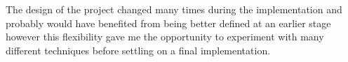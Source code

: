\documentclass[12pt,a4paper]{article}
\begin{document}
The design of the project changed many times during the implementation and probably would have benefited from being better defined at an earlier stage however this flexibility gave me the opportunity to experiment with many different techniques before settling on a final implementation. 

%
%
%	
%	
%	
%	
%	
%	
%	
\end{document}
